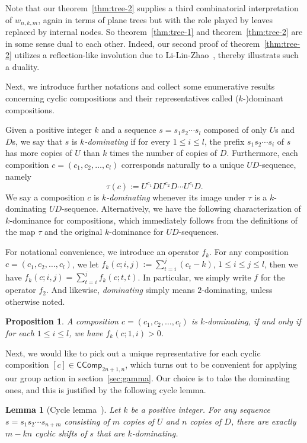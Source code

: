 \documentclass[reqno]{amsart}
\numberwithin{equation}{section}
\newtheorem{lemma}[theorem]{Lemma}
\newtheorem{proposition}[theorem]{Proposition}
\theoremstyle{definition}
\theoremstyle{named}
\def\CComp{\mathsf{CComp}}
\begin{document}
Note that our theorem~\ref{thm:tree-2} supplies a third combinatorial interpretation of $w_{n,k,m}$, again in terms of plane trees but with the role played by leaves replaced by internal nodes. So theorem~\ref{thm:tree-1} and theorem~\ref{thm:tree-2} are in some sense dual to each other. Indeed, our second proof of theorem~\ref{thm:tree-2} utilizes a reflection-like involution due to Li-Lin-Zhao~\cite{LLZ2024}, thereby illustrats such a duality.

Next, we introduce further notations and collect some enumerative results concerning cyclic compositions and their representatives called ($k$-)dominant compositions.

Given a positive integer $k$ and a sequence $s=s_1s_2\cdots s_l$ composed of only $U$s and $D$s, we say that $s$ is {\it $k$-dominating} if for every $1\le i\le l$, the prefix $s_1s_2\cdots s_i$ of $s$ has more copies of $U$ than $k$ times the number of copies of $D$. Furthermore, each composition $c=(c_1,c_2,\ldots,c_l)$ corresponds naturally to a unique $UD$-sequence, namely
$$\tau(c):=U^{c_1}DU^{c_2}D\cdots U^{c_l}D.$$
We say a composition $c$ is {\it $k$-dominating} whenever its image under $\tau$ is a $k$-dominating $UD$-sequence. Alternatively, we have the following characterization of $k$-dominance for compositions, which immediately follows from the definitions of the map $\tau$ and the original $k$-dominance for $UD$-sequences.

 

For notational convenience, we introduce an operator $f_k$. For any composition $c=(c_1,c_2,\ldots,c_l)$, we let $f_k(c;i,j):=\sum_{t=i}^j (c_t-k)$, $1\le i\le j\le l$, then we have $f_k(c;i,j)=\sum_{t=i}^{j} f_k(c;t,t)$. In particular, we simply write $f$ for the operator $f_2$. And likewise, {\it dominating} simply means $2$-dominating, unless otherwise noted.

\begin{proposition}\label{char:k-domi}
A composition $c=(c_1,c_2,\ldots,c_l)$ is $k$-dominating, if and only if for each $1\le i\le l$, we have $f_k(c;1,i)>0$.
\end{proposition}

Next, we would like to pick out a unique representative for each cyclic composition $[c]\in\CComp_{2n+1,n}$, which turns out to be convenient for applying our group action in section~\ref{sec:gamma}. Our choice is to take the dominating ones, and this is justified by the following cycle lemma.

\begin{lemma}[Cycle lemma~\cite{DM1947}] 
Let $k$ be a positive integer. For any sequence $s=s_1s_2\cdots s_{n+m}$ consisting of $m$ copies of $U$ and $n$ copies of $D$, there are exactly $m-kn$ cyclic shifts of $s$ that are $k$-dominating.
\end{lemma}
\end{document}
